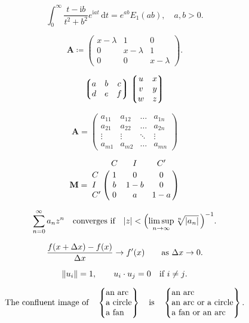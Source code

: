 \documentclass[12pt, a4paper, oneside]{article}
\newcommand{\mathup}[1]{\mathrm{#1}}
\theoremstyle{Plain}
\theoremstyle{Definition}
\theoremstyle{Remark}
\begin{document}
\begin{appendix}

$$\int_0^\infty \frac{t - \mathup{i} b}{t^2 + b^2}e^{\mathup{i}at}\,\mathup{d}t=e^{ab}E_1(ab), \quad
a,b > 0.$$


$$\mathbf{A} \coloneq \begin{pmatrix}x-\lambda&1&0\\
0&x-\lambda&1\\
0&0&x-\lambda\end{pmatrix}.$$

$$\left\lgroup\begin{matrix}a&b&c\\ d&e&f\\\end{matrix}\right\rgroup
\left\lgroup\begin{matrix}u&x\cr v&y\cr w&z\end{matrix}\right\rgroup$$


$$\mathbf{A} = \begin{pmatrix}a_{11}&a_{12}&\ldots&a_{1n}\\
a_{21}&a_{22}&\ldots&a_{2n}\\
\vdots&\vdots&\ddots&\vdots\\
a_{m1}&a_{m2}&\ldots&a_{mn}\end{pmatrix}$$

$$\mathbf{M}=\bordermatrix{&C&I&C'\cr
	C&1&0&0\cr I&b&1-b&0\cr C'&0&a&1-a}$$


$$\sum_{n=0}^\infty a_nz^n\quad\hbox{converges if}\quad
|z|<\Bigl(\limsup_{n\to\infty}\root n\of{|a_n|}\,\Bigr)^{-1}.$$

$$\frac{f(x+\mathup{\Delta} x)-f(x)}{\mathup{\Delta} x}\to f'(x)
\qquad \hbox{as $\mathup{\Delta} x\to0$.}$$

$$\|u_i\|=1,\qquad u_i\cdot u_j=0\quad\hbox{if $i\ne j$.}$$


$$\hbox{The confluent image of}\quad
\begin{Bmatrix}\hbox{an arc}\hfill\\%
\hbox{a circle}\hfill\\%
\hbox{a fan}\hfill\end{Bmatrix}
\quad\hbox{is}\quad
\begin{Bmatrix}\hbox{an arc}\hfill\\%
\hbox{an arc or a circle}\hfill\\%
\hbox{a fan or an arc}\hfill\end{Bmatrix}.$$


\end{appendix}
\end{document}
